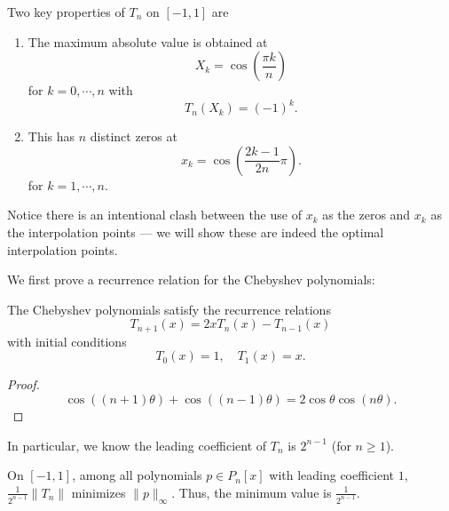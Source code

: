 \documentclass[a4paper]{article}
\begin{document}
Two key properties of $T_n$ on $[-1, 1]$ are
\begin{enumerate}
  \item The maximum absolute value is obtained at
    \[
      X_k = \cos\left(\frac{\pi k}{n}\right)
    \]
    for $k = 0, \cdots, n$ with
    \[
      T_n(X_k) = (-1)^k.
    \]
  \item This has $n$ distinct zeros at
    \[
      x_k = \cos\left(\frac{2k - 1}{2n}\pi\right).
    \]
    for $k = 1, \cdots, n$.
\end{enumerate}
Notice there is an intentional clash between the use of $x_k$ as the zeros and $x_k$ as the interpolation points --- we will show these are indeed the optimal interpolation points.
\begin{center}
\end{center}
We first prove a recurrence relation for the Chebyshev polynomials:
\begin{lemma}
  The Chebyshev polynomials satisfy the recurrence relations
  \[
    T_{n + 1}(x) = 2x T_n(x) - T_{n - 1}(x)
  \]
  with initial conditions
  \[
    T_0(x) = 1,\quad T_1(x) = x.
  \]
\end{lemma}
\begin{proof}
  \[
    \cos((n + 1) \theta) + \cos((n - 1)\theta) = 2\cos \theta \cos(n\theta).
  \]
\end{proof}
In particular, we know the leading coefficient of $T_n$ is $2^{n - 1}$ (for $n \geq 1$).

\begin{thm}
  On $[-1, 1]$, among all polynomials $p \in P_n[x]$ with leading coefficient $1$, $\frac{1}{2^{n - 1}} \|T_n\|$ minimizes $\|p\|_{\infty}$. Thus, the minimum value is $\frac{1}{2^{n - 1}}$.
\end{thm}
\end{document}
